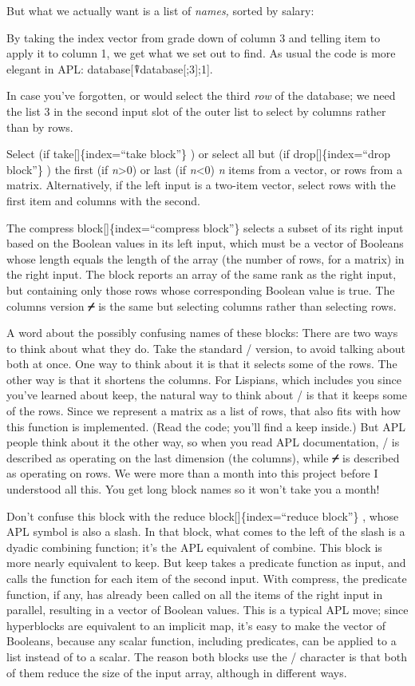 \documentclass[
  letterpaper,
]{book}
\begin{document}
But what we actually want is a list of \emph{names,} sorted by salary:

By taking the index vector from grade down of column 3 and telling item
to apply it to column 1, we get what we set out to find. As usual the
code is more elegant in APL: database{[}⍒database{[};3{]};1{]}.

In case you've forgotten, or would select the third \emph{row} of the
database; we need the list 3 in the second input slot of the outer list
to select by columns rather than by rows.

Select (if take{[}{]}\{index=``take block''\} ) or select all but (if
drop{[}{]}\{index=``drop block''\} ) the first (if
\emph{n}\textgreater0) or last (if \emph{n}\textless0)
\textbar{}\emph{n}\textbar{} items from a vector, or rows from a matrix.
Alternatively, if the left input is a two-item vector, select rows with
the first item and columns with the second.

The compress block{[}{]}\{index=``compress block''\} selects a subset of
its right input based on the Boolean values in its left input, which
must be a vector of Booleans whose length equals the length of the array
(the number of rows, for a matrix) in the right input. The block reports
an array of the same rank as the right input, but containing only those
rows whose corresponding Boolean value is true. The columns version
\textbf{⌿} is the same but selecting columns rather than selecting rows.

A word about the possibly confusing names of these blocks: There are two
ways to think about what they do. Take the standard / version, to avoid
talking about both at once. One way to think about it is that it selects
some of the rows. The other way is that it shortens the columns. For
Lispians, which includes you since you've learned about keep, the
natural way to think about / is that it keeps some of the rows. Since we
represent a matrix as a list of rows, that also fits with how this
function is implemented. (Read the code; you'll find a keep inside.) But
APL people think about it the other way, so when you read APL
documentation, / is described as operating on the last dimension (the
columns), while \textbf{⌿} is described as operating on rows. We were
more than a month into this project before I understood all this. You
get long block names so it won't take you a month!

Don't confuse this block with the reduce block{[}{]}\{index=``reduce
block''\} , whose APL symbol is also a slash. In that block, what comes
to the left of the slash is a dyadic combining function; it's the APL
equivalent of combine. This block is more nearly equivalent to keep. But
keep takes a predicate function as input, and calls the function for
each item of the second input. With compress, the predicate function, if
any, has already been called on all the items of the right input in
parallel, resulting in a vector of Boolean values. This is a typical APL
move; since hyperblocks are equivalent to an implicit map, it's easy to
make the vector of Booleans, because any scalar function, including
predicates, can be applied to a list instead of to a scalar. The reason
both blocks use the / character is that both of them reduce the size of
the input array, although in different ways.
\end{document}
